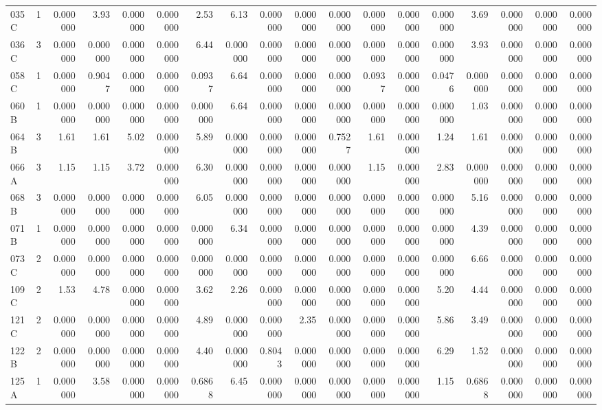 {\begin{longtable}{lrrrrrrrrrrrrrrrrr}
  035C & 1 & 0.000000 & 3.93 & 0.000000 & 0.000000 & 2.53 & 6.13 & 0.000000 & 0.000000 & 0.000000 & 0.000000 & 0.000000 & 0.000000 & 3.69 & 0.000000 & 0.000000 & 0.000000 \\
  036C & 3 & 0.000000 & 0.000000 & 0.000000 & 0.000000 & 6.44 & 0.000000 & 0.000000 & 0.000000 & 0.000000 & 0.000000 & 0.000000 & 0.000000 & 3.93 & 0.000000 & 0.000000 & 0.000000 \\
  058C & 1 & 0.000000 & 0.9047 & 0.000000 & 0.000000 & 0.0937 & 6.64 & 0.000000 & 0.000000 & 0.000000 & 0.0937 & 0.000000 & 0.0476 & 0.000000 & 0.000000 & 0.000000 & 0.000000 \\
  060B & 1 & 0.000000 & 0.000000 & 0.000000 & 0.000000 & 0.000000 & 6.64 & 0.000000 & 0.000000 & 0.000000 & 0.000000 & 0.000000 & 0.000000 & 1.03 & 0.000000 & 0.000000 & 0.000000 \\
  064B & 3 & 1.61 & 1.61 & 5.02 & 0.000000 & 5.89 & 0.000000 & 0.000000 & 0.000000 & 0.7527 & 1.61 & 0.000000 & 1.24 & 1.61 & 0.000000 & 0.000000 & 0.000000 \\
  066A & 3 & 1.15 & 1.15 & 3.72 & 0.000000 & 6.30 & 0.000000 & 0.000000 & 0.000000 & 0.000000 & 1.15 & 0.000000 & 2.83 & 0.000000 & 0.000000 & 0.000000 & 0.000000 \\
  068B & 3 & 0.000000 & 0.000000 & 0.000000 & 0.000000 & 6.05 & 0.000000 & 0.000000 & 0.000000 & 0.000000 & 0.000000 & 0.000000 & 0.000000 & 5.16 & 0.000000 & 0.000000 & 0.000000 \\
  071B & 1 & 0.000000 & 0.000000 & 0.000000 & 0.000000 & 0.000000 & 6.34 & 0.000000 & 0.000000 & 0.000000 & 0.000000 & 0.000000 & 0.000000 & 4.39 & 0.000000 & 0.000000 & 0.000000 \\
  073C & 2 & 0.000000 & 0.000000 & 0.000000 & 0.000000 & 0.000000 & 0.000000 & 0.000000 & 0.000000 & 0.000000 & 0.000000 & 0.000000 & 0.000000 & 6.66 & 0.000000 & 0.000000 & 0.000000 \\
  109C & 2 & 1.53 & 4.78 & 0.000000 & 0.000000 & 3.62 & 2.26 & 0.000000 & 0.000000 & 0.000000 & 0.000000 & 0.000000 & 5.20 & 4.44 & 0.000000 & 0.000000 & 0.000000 \\
  121C & 2 & 0.000000 & 0.000000 & 0.000000 & 0.000000 & 4.89 & 0.000000 & 0.000000 & 2.35 & 0.000000 & 0.000000 & 0.000000 & 5.86 & 3.49 & 0.000000 & 0.000000 & 0.000000 \\
  122B & 2 & 0.000000 & 0.000000 & 0.000000 & 0.000000 & 4.40 & 0.000000 & 0.8043 & 0.000000 & 0.000000 & 0.000000 & 0.000000 & 6.29 & 1.52 & 0.000000 & 0.000000 & 0.000000 \\
  125A & 1 & 0.000000 & 3.58 & 0.000000 & 0.000000 & 0.6868 & 6.45 & 0.000000 & 0.000000 & 0.000000 & 0.000000 & 0.000000 & 1.15 & 0.6868 & 0.000000 & 0.000000 & 0.000000 \\

\end{longtable}}
